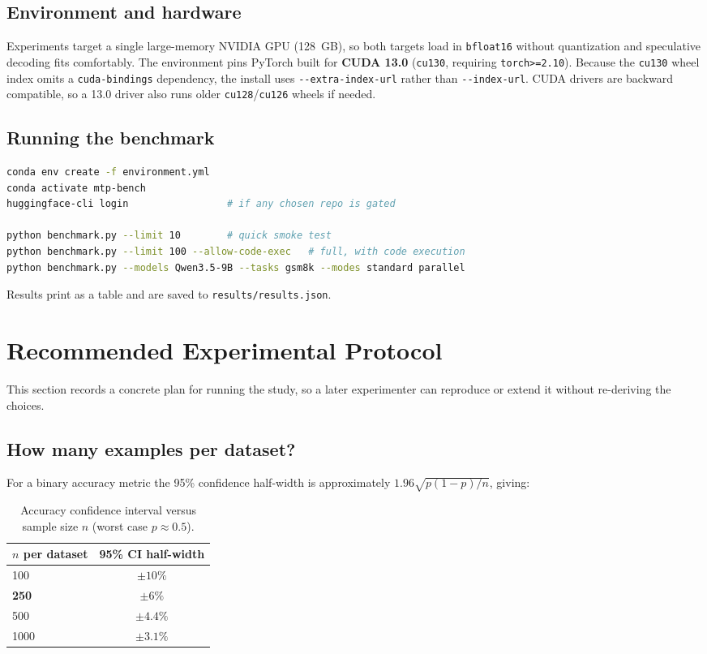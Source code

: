 \documentclass[11pt]{article}
\begin{document}
\subsection{Environment and hardware}
Experiments target a single large-memory NVIDIA GPU (128~GB), so both targets
load in \texttt{bfloat16} without quantization and speculative decoding fits
comfortably. The environment pins PyTorch built for \textbf{CUDA 13.0}
(\texttt{cu130}, requiring \texttt{torch>=2.10}). Because the \texttt{cu130}
wheel index omits a \texttt{cuda-bindings} dependency, the install uses
\texttt{-{}-extra-index-url} rather than \texttt{-{}-index-url}. CUDA drivers are
backward compatible, so a 13.0 driver also runs older \texttt{cu128}/\texttt{cu126}
wheels if needed.

\subsection{Running the benchmark}
\begin{lstlisting}[language=bash,basicstyle=\ttfamily\footnotesize]
conda env create -f environment.yml
conda activate mtp-bench
huggingface-cli login                 # if any chosen repo is gated

python benchmark.py --limit 10        # quick smoke test
python benchmark.py --limit 100 --allow-code-exec   # full, with code execution
python benchmark.py --models Qwen3.5-9B --tasks gsm8k --modes standard parallel
\end{lstlisting}
Results print as a table and are saved to \texttt{results/results.json}.

\section{Recommended Experimental Protocol}
\label{sec:protocol}
This section records a concrete plan for running the study, so a later
experimenter can reproduce or extend it without re-deriving the choices.

\subsection{How many examples per dataset?}
For a binary accuracy metric the 95\% confidence half-width is approximately
$1.96\sqrt{p(1-p)/n}$, giving:

\begin{table}[h]
\centering
\caption{Accuracy confidence interval versus sample size $n$ (worst case $p\approx0.5$).}
\begin{tabular}{@{}lc@{}}
\toprule
\textbf{$n$ per dataset} & \textbf{95\% CI half-width} \\
\midrule
100  & $\pm10\%$ \\
\textbf{250}  & $\pm6\%$ \\
500  & $\pm4.4\%$ \\
1000 & $\pm3.1\%$ \\
\bottomrule
\end{tabular}
\end{table}
\end{document}
